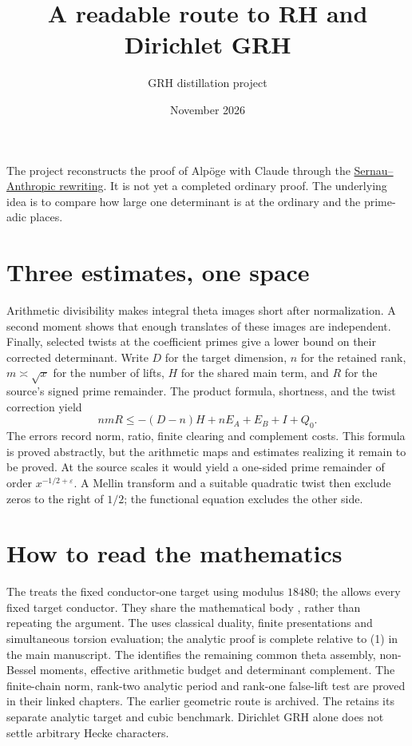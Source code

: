 
\title{A readable route to RH and Dirichlet GRH}
\author{GRH distillation project}
\date{November 2026}

\maketitle
The project reconstructs the proof of Alp\"oge with Claude through
the \href{\sourcepin}{Sernau--Anthropic rewriting}. It is not yet a
completed ordinary proof. The underlying idea is to compare how large
one determinant is at the ordinary and the prime-adic places.

\section{Three estimates, one space}
Arithmetic divisibility makes integral theta images short after
normalization. A second moment shows that enough translates of
these images are independent. Finally, selected twists at the
coefficient primes give a lower bound on their corrected determinant.
Write \(D\) for the target dimension, \(n\) for the retained rank,
\(m\asymp\sqrt{x}\) for the number of lifts, \(H\) for the shared main
term, and \(R\) for the source's signed prime remainder.
The product formula, shortness, and the twist correction yield
\[
 nmR\le -(D-n)H+nE_A+E_B+I+Q_0.
\]
The errors record norm, ratio, finite clearing and complement costs.
This formula is proved abstractly, but the arithmetic maps and
estimates realizing it remain to be proved. At the source scales it
would yield a one-sided prime remainder of order
\(x^{-1/2+\varepsilon}\). A Mellin transform and a suitable quadratic
twist then exclude zeros to the right of \(1/2\); the functional equation
excludes the other side.

\section{How to read the mathematics}
The  treats the fixed
conductor-one target using modulus \(18480\); the
 allows every
fixed target conductor. They share the mathematical body
, rather than repeating
the argument.
The  uses classical duality, finite presentations and simultaneous
torsion evaluation; the 
{analytic proof} is complete relative to (1) in the main manuscript.
The  identifies
the remaining common theta assembly, non-Bessel moments, effective
arithmetic budget and determinant complement. The finite-chain norm,
rank-two analytic period and rank-one false-lift test are proved in
their linked chapters. The earlier geometric route is archived.
The  retains its separate
analytic target and cubic benchmark. Dirichlet GRH alone does not
settle arbitrary Hecke characters.


